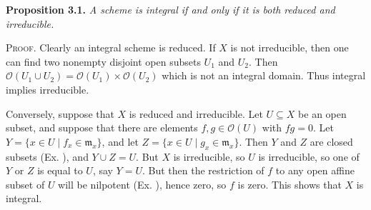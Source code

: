 {\smallskip
\noindent\hypertarget{result-II-3.1}{}\textbf{Proposition 3.1.} \emph{A scheme is integral if and only if it is both reduced and irreducible.}

\smallskip
\noindent\textsc{Proof.} Clearly an integral scheme is reduced. If $X$ is not irreducible, then one can find two nonempty disjoint open subsets $U_1$ and $U_2$. Then $\mathcal O(U_1\cup U_2)=\mathcal O(U_1)\times\mathcal O(U_2)$ which is not an integral domain. Thus integral implies irreducible.

Conversely, suppose that $X$ is reduced and irreducible. Let $U\subseteq X$ be an \EditionText{}open subset, and suppose that there are elements $f,g\in\mathcal O(U)$ with $fg=0$. Let $Y=\{x\in U\mid f_x\in\mathfrak m_x\}$, and let $Z=\{x\in U\mid g_x\in\mathfrak m_x\}$. Then $Y$ and $Z$ are closed subsets (Ex. ), and $Y\cup Z=U$. But $X$ is irreducible, so $U$ is irreducible, so one of $Y$ or $Z$ is equal to $U$, say $Y=U$. But then the restriction of $f$ to any open affine subset of $U$ will be nilpotent (Ex. ), hence zero, so $f$ is zero. This shows that $X$ is integral.}
